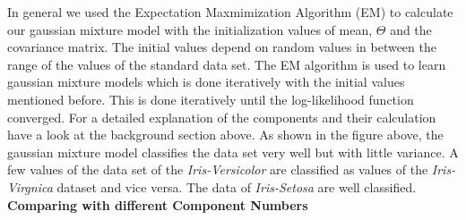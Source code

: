 \documentclass[a4paper]{article}
\begin{document}
\begin{enumerate}
In general we used the Expectation Maxmimization Algorithm (EM) to calculate our gaussian mixture model with the initialization values of mean, $\Theta$ and the covariance matrix. The initial values depend on random values in between the range of the values of the standard data set. The EM algorithm is used to learn gaussian mixture models which is done iteratively with the initial values mentioned before. This is done iteratively until the log-likelihood function converged. For a detailed explanation of the components and their calculation have a look at the background section above. As shown in the figure above, the gaussian mixture model classifies the data set very well but with little variance. A few values of the data set of the \textit{Iris-Versicolor} are classified as values of the \textit{Iris-Virgnica} dataset and vice versa. The data of \textit{Iris-Setosa} are well classified. \\
\newpage
{\large \textbf{Comparing with different Component Numbers}} \\



\end{enumerate}
\end{document}
